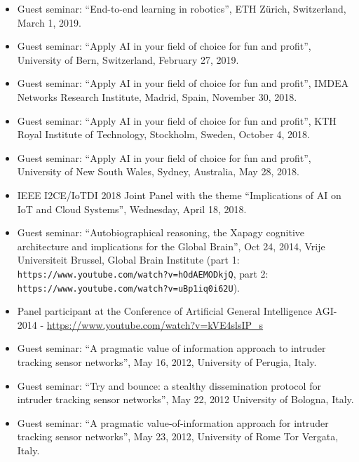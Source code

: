 \begin{itemize}[nosep, noitemsep]
    \item Guest seminar: ``End-to-end learning in robotics'',
            ETH Z{\"u}rich, Switzerland, March 1, 2019.
    
    \item Guest seminar: ``Apply AI in your field of choice for fun and profit'',
            University of Bern, Switzerland, February 27, 2019.
    
    \item Guest seminar: ``Apply AI in your field of choice for fun and profit'',
        IMDEA Networks  Research Institute, Madrid, Spain, November 30, 2018.
    
    \item Guest seminar: ``Apply AI in your field of choice for fun and profit'',
    KTH Royal Institute of Technology, Stockholm, Sweden, October 4, 2018.
    
    \item Guest seminar: ``Apply AI in your field of choice for fun and profit'',
    University of New South Wales, Sydney, Australia, May 28, 2018.
    
    \item IEEE I2CE/IoTDI 2018 Joint Panel with the theme
        ``Implications of AI on IoT and Cloud Systems'', Wednesday, April 18, 2018.
    
    \item Guest seminar: ``Autobiographical reasoning, the Xapagy cognitive architecture and implications for the Global Brain'', Oct 24, 2014, Vrije Universiteit Brussel, Global Brain Institute (part 1: {\tt \small https://www.youtube.com/watch?v=hOdAEMODkjQ}, part 2: {\tt https://www.youtube.com/watch?v=uBp1iq0i62U}).
    
    \item Panel participant at the Conference of Artificial General Intelligence AGI-2014 - \url{https://www.youtube.com/watch?v=kVE4slsIP_s}
    
    \item Guest seminar: ``A pragmatic value of information approach to intruder tracking sensor networks'', May 16, 2012, University of Perugia, Italy.
    
    \item Guest seminar: ``Try and bounce: a stealthy dissemination protocol for intruder tracking sensor networks'', May 22, 2012 University of Bologna, Italy.
    
    \item Guest seminar: ``A pragmatic value-of-information approach for intruder tracking sensor networks'', May 23, 2012, University of Rome Tor Vergata, Italy.
    

\end{itemize}
